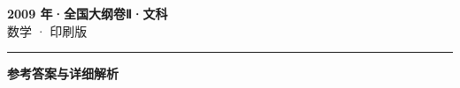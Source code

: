 \documentclass[zihao=5, a4paper]{ctexart}
\begin{document}
\begin{center}
  {\Large\bfseries 2009 年·全国大纲卷Ⅱ·文科}\\[4pt]
  {\large 数学 · 印刷版}
\end{center}
\medskip
{}

\par\bigskip\hrule\bigskip
{}
\begin{center}{\large\bfseries 参考答案与详细解析}\end{center}
\smallskip

\end{document}
